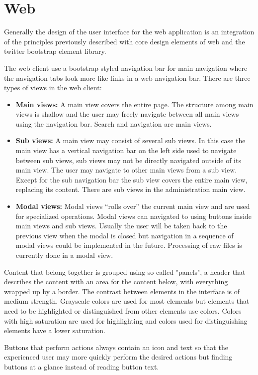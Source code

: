 \section{Web}
Generally the design of the user interface for the web application is an integration of the principles previously described with core design elements of web and the twitter bootstrap element library.

The web client use a bootstrap styled navigation bar for main navigation where the navigation tabs look more like links in a web navigation bar. There are three types of views in the web client:
\begin{itemize}
	\item \textbf{Main views:} A main view covers the entire page. The structure among main views is shallow and the user may freely navigate between all main views using the navigation bar. Search and navigation are main views.
	\item \textbf{Sub views:} A main view may consist of several sub views. In this case the main view has a vertical navigation bar on the left side used to navigate between sub views, sub views may not be directly navigated outside of its main view. The user may navigate to other main views from a sub view. Except for the sub navigation bar the sub view covers the entire main view, replacing its content. There are sub views in the administration main view.
	\item \textbf{Modal views:} Modal views “rolls over” the current main view and are used for specialized operations. Modal views can navigated to using buttons inside main views and sub views. Usually the user will be taken back to the previous view when the modal is closed but navigation in a sequence of modal views could be implemented in the future. Processing of raw files is currently done in a modal view.
\end{itemize}
Content that belong together is grouped using so called "panels", a header that describes the content with an area for the content below, with everything wrapped up by a border.
The contrast between elements in the interface is of medium strength. Grayscale colors are used for most elements but elements that need to be highlighted or distinguished from other elements use colors. Colors with high saturation are used for highlighting and colors used for distinguishing elements have a lower saturation.

Buttons that perform actions always contain an icon and text so that the experienced user may more quickly perform the desired actions but finding buttons at a glance instead of reading button text.
